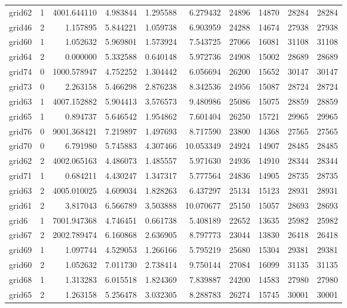 \begin{longtable}{|l|r|r|r|r|r|r|r|r|r|}
grid62 & 1 & 4001.644110 & 4.983844 & 1.295588 & 6.279432 & 24896 & 14870 & 28284 & 28284 \\
grid46 & 2 & 1.157895 & 5.844221 & 1.059738 & 6.903959 & 24288 & 14674 & 27938 & 27938 \\
grid60 & 1 & 1.052632 & 5.969801 & 1.573924 & 7.543725 & 27066 & 16081 & 31108 & 31108 \\
grid64 & 2 & 0.000000 & 5.332588 & 0.640148 & 5.972736 & 24908 & 15002 & 28689 & 28689 \\
grid74 & 0 & 1000.578947 & 4.752252 & 1.304442 & 6.056694 & 26200 & 15652 & 30147 & 30147 \\
grid73 & 0 & 2.263158 & 5.466298 & 2.876238 & 8.342536 & 24956 & 15087 & 28724 & 28724 \\
grid63 & 1 & 4007.152882 & 5.904413 & 3.576573 & 9.480986 & 25086 & 15075 & 28859 & 28859 \\
grid65 & 1 & 0.894737 & 5.646542 & 1.954862 & 7.601404 & 26250 & 15721 & 29965 & 29965 \\
grid76 & 0 & 9001.368421 & 7.219897 & 1.497693 & 8.717590 & 23800 & 14368 & 27565 & 27565 \\
grid70 & 0 & 6.791980 & 5.745883 & 4.307466 & 10.053349 & 24924 & 14907 & 28485 & 28485 \\
grid62 & 2 & 4002.065163 & 4.486073 & 1.485557 & 5.971630 & 24936 & 14910 & 28344 & 28344 \\
grid71 & 1 & 0.684211 & 4.430247 & 1.347317 & 5.777564 & 24836 & 14905 & 28735 & 28735 \\
grid63 & 2 & 4005.010025 & 4.609034 & 1.828263 & 6.437297 & 25134 & 15123 & 28931 & 28931 \\
grid61 & 2 & 3.817043 & 6.566789 & 3.503888 & 10.070677 & 25150 & 15057 & 28693 & 28693 \\
grid6 & 1 & 7001.947368 & 4.746451 & 0.661738 & 5.408189 & 22652 & 13635 & 25982 & 25982 \\
grid67 & 2 & 2002.789474 & 6.160868 & 2.636905 & 8.797773 & 23044 & 13830 & 26418 & 26418 \\
grid69 & 1 & 1.097744 & 4.529053 & 1.266166 & 5.795219 & 25680 & 15304 & 29381 & 29381 \\
grid60 & 2 & 1.052632 & 7.011730 & 2.738414 & 9.750144 & 27084 & 16099 & 31135 & 31135 \\
grid68 & 1 & 1.313283 & 6.015518 & 1.824369 & 7.839887 & 24200 & 14583 & 27980 & 27980 \\
grid65 & 2 & 1.263158 & 5.256478 & 3.032305 & 8.288783 & 26274 & 15745 & 30001 & 30001 \\

\end{longtable}

